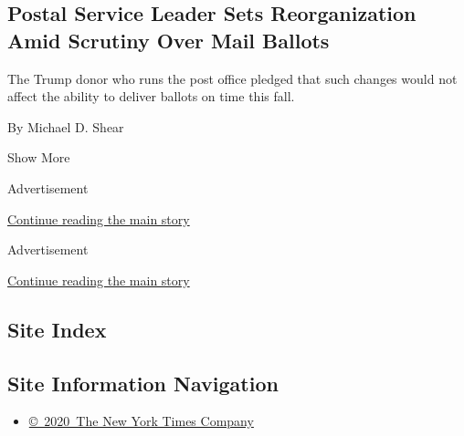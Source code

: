 \begin{enumerate}
  \hypertarget{postal-service-leader-sets-reorganization-amid-scrutiny-over-mail-ballots}{%
  \subsection{Postal Service Leader Sets Reorganization Amid Scrutiny
  Over Mail
  Ballots}\label{postal-service-leader-sets-reorganization-amid-scrutiny-over-mail-ballots}}

  The Trump donor who runs the post office pledged that such changes
  would not affect the ability to deliver ballots on time this fall.

  By Michael D. Shear
\end{enumerate}

Show More

Advertisement

\protect\hyperlink{after-mid2}{Continue reading the main story}

Advertisement

\protect\hyperlink{after-mktg}{Continue reading the main story}

\hypertarget{site-index}{%
\subsection{Site Index}\label{site-index}}

\hypertarget{site-information-navigation}{%
\subsection{Site Information
Navigation}\label{site-information-navigation}}

\begin{itemize}
\tightlist
\item
  \href{https://help.nytimes.com/hc/en-us/articles/115014792127-Copyright-notice}{©~2020~The
  New York Times Company}
\end{itemize}

